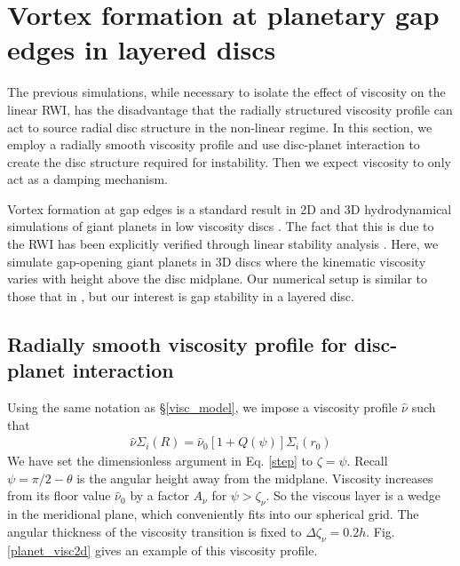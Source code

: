 \section{Vortex formation at planetary gap edges in layered
  discs}\label{disc-planet} 
The previous simulations, while necessary to isolate the effect of 
viscosity on the linear RWI, has the disadvantage that the radially
structured viscosity profile can act to source radial disc structure
in the non-linear regime. In this section, we employ a radially smooth
viscosity profile and use 
disc-planet interaction to
create the disc structure required for instability. Then we expect viscosity to only
act as a damping mechanism. 

Vortex formation at gap edges is a standard result in 
2D and 3D hydrodynamical simulations of giant planets in low viscosity discs 
\citep{valborro07,lin10,lin11a,lin12}. The fact that this is due to
the RWI has been explicitly verified through linear stability
analysis %
\citep{valborro07,lin10}. Here, we simulate gap-opening giant planets
in 3D discs where the kinematic viscosity varies with height above the
disc midplane. Our numerical setup is similar to
those that in \cite{pierens10}, but our interest is gap
stability in a layered disc. 
 
\subsection{Radially smooth viscosity profile for disc-planet
  interaction}\label{planet_visc_mode} 
Using the same notation as \S\ref{visc_model}, we impose a viscosity
profile $\hat{\nu}$ such that 
\begin{align}\label{planet_visc_profile}
  \hat{\nu}\Sigma_i(R)=
  \hat{\nu}_0\left[1+Q(\psi)\right]\Sigma_i(r_0)   
\end{align}
We have set the dimensionless argument in Eq. \ref{step} to
$\zeta=\psi$. Recall $\psi=\pi/2-\theta$ is the angular height away from the midplane. 
Viscosity increases from its floor value $\hat{\nu}_0$ by a factor
$A_\nu$ for $\psi > \zeta_\nu$. So the viscous layer is 
a wedge in the meridional plane, which conveniently fits into our
spherical grid.  
The angular thickness of the viscosity
transition is fixed to $\Delta\zeta_\nu =
0.2h$. Fig. \ref{planet_visc2d} gives an example of this  
viscosity profile. 

